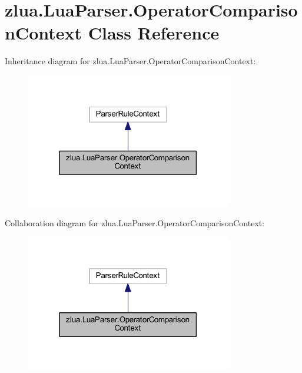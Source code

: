 \hypertarget{classzlua_1_1_lua_parser_1_1_operator_comparison_context}{}\section{zlua.\+Lua\+Parser.\+Operator\+Comparison\+Context Class Reference}
\label{classzlua_1_1_lua_parser_1_1_operator_comparison_context}


Inheritance diagram for zlua.\+Lua\+Parser.\+Operator\+Comparison\+Context\+:
\nopagebreak
\begin{figure}[H]
\begin{center}
\leavevmode
\includegraphics[width=254pt]{classzlua_1_1_lua_parser_1_1_operator_comparison_context__inherit__graph}
\end{center}
\end{figure}


Collaboration diagram for zlua.\+Lua\+Parser.\+Operator\+Comparison\+Context\+:
\nopagebreak
\begin{figure}[H]
\begin{center}
\leavevmode
\includegraphics[width=254pt]{classzlua_1_1_lua_parser_1_1_operator_comparison_context__coll__graph}
\end{center}
\end{figure}
